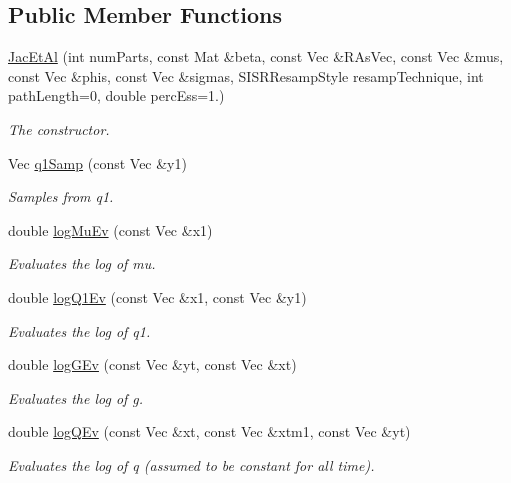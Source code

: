 \subsection*{Public Member Functions}
\begin{DoxyCompactItemize}
\item 
\hyperlink{classJacEtAl_a356023f0edf2c58601e47f8cc0fe4ae0}{Jac\+Et\+Al} (int num\+Parts, const Mat \&beta, const Vec \&R\+As\+Vec, const Vec \&mus, const Vec \&phis, const Vec \&sigmas, S\+I\+S\+R\+Resamp\+Style resamp\+Technique, int path\+Length=0, double perc\+Ess=1.)
\begin{DoxyCompactList}\small\item\em The constructor. \end{DoxyCompactList}\item 
Vec \hyperlink{classJacEtAl_a154ca22da5c981f2d0c9515dc89a472c}{q1\+Samp} (const Vec \&y1)
\begin{DoxyCompactList}\small\item\em Samples from q1. \end{DoxyCompactList}\item 
double \hyperlink{classJacEtAl_a96f970a2b0e7f0583a5fe567b6353ffe}{log\+Mu\+Ev} (const Vec \&x1)
\begin{DoxyCompactList}\small\item\em Evaluates the log of mu. \end{DoxyCompactList}\item 
double \hyperlink{classJacEtAl_aec5fff50e30a9df174b04f2ab53c73d0}{log\+Q1\+Ev} (const Vec \&x1, const Vec \&y1)
\begin{DoxyCompactList}\small\item\em Evaluates the log of q1. \end{DoxyCompactList}\item 
double \hyperlink{classJacEtAl_aa37b7701fac288d76b72640b2c98f253}{log\+G\+Ev} (const Vec \&yt, const Vec \&xt)
\begin{DoxyCompactList}\small\item\em Evaluates the log of g. \end{DoxyCompactList}\item 
double \hyperlink{classJacEtAl_a73a94bbb16389102b20def8c0bdf96d8}{log\+Q\+Ev} (const Vec \&xt, const Vec \&xtm1, const Vec \&yt)
\begin{DoxyCompactList}\small\item\em Evaluates the log of q (assumed to be constant for all time). \end{DoxyCompactList}\item 

\end{DoxyCompactItemize}
